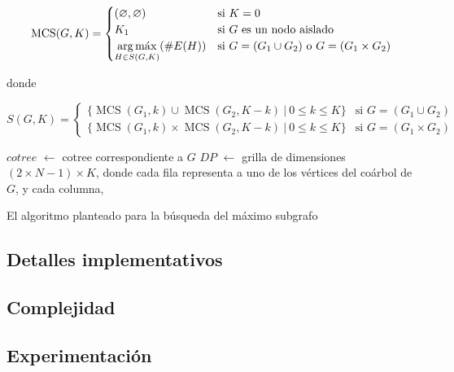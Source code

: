 \[
    \operatorname{MCS}(G, K) = \begin{cases}
        (\varnothing, \varnothing) & \text{si } K = 0 \\
        K_1 & \text{si } G \text{ es un nodo aislado} \\
        \displaystyle \argmax_{H \in S(G, K)}(\#E(H)) & \text{si } G = (G_1
        \cup G_2) \text{ o } G = (G_1 \times G_2) \\
    \end{cases}
\]

donde

\[
    S(G, K) = \begin{cases}
        \lbrace \operatorname{MCS}(G_1, k) \cup \operatorname{MCS}(G_2, K -
        k) \ \vert\ 0 \leq k \leq K \rbrace & \text{si } G = (G_1 \cup G_2) \\
        \lbrace \operatorname{MCS}(G_1, k) \times \operatorname{MCS}(G_2, K -
        k) \ \vert\ 0 \leq k \leq K \rbrace & \text{si } G = (G_1 \times G_2)
    \end{cases}
\]

\begin{algorithm}[H]

    $cotree$ $\gets$ cotree correspondiente a $G$ \;
    $DP$ $\gets$ grilla de dimensiones $(2 \times N - 1) \times K$, donde \;
    cada fila representa a uno de los vértices del coárbol de $G$, y cada \;
    columna,
\end{algorithm}


El algoritmo planteado para la búsqueda del máximo subgrafo


\subsection{Detalles implementativos}

\subsection{Complejidad}

\subsection{Experimentación}

